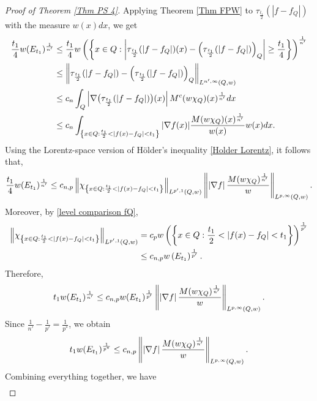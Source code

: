 \documentclass[10pt,a4paper]{amsart}
\newcommand{\strt}[1]{\rule{0pt}{#1}}
\begin{document}
\begin{proof}[Proof of Theorem \ref{Thm PS 4}]
Applying Theorem \ref{Thm FPW} to $\tau_{\frac{t_1}{2}}(|f-f_Q|)$ with the measure $w(x)dx$, we get
\begin{align*}
    \frac{t_1}{4}w(E_{t_1})^\frac{1}{n'}
    &\le \frac{t_1}{4} w\left( \left\{ x\in Q: \left| \tau_{\frac{t_1}{2}}(|f-f_Q|)(x) - \left(\tau_{\frac{t_1}{2}}(|f-f_Q|)\right)_Q \right| \ge \frac{t_1}{4} \right\} \right)^\frac{1}{n'} \\
    &\le \left\| \tau_{\frac{t_1}{2}}(|f-f_Q|) - \left(\tau_{\frac{t_1}{2}}(|f-f_Q|)\right)_Q \right\|_{\strt{2.3ex} L^{n',\infty}(Q, w)} \\
    &\le c_n \int_Q \left|\nabla \big( \tau_{\frac{t_1}{2}}(|f-f_Q|)\big)(x)\right| M^c(w\chi_Q)(x)^\frac{1}{n'}dx \\
    &\le c_n \int_{\left\{x\in Q:\frac{t_1}{2}<|f(x)-f_Q|<t_1\right\}} |\nabla f(x)| \frac{M(w\chi_Q)(x)^\frac{1}{n'}}{w(x)} w(x)dx.
\end{align*}
Using the Lorentz-space version of Hölder's inequality \eqref{Holder Lorentz}, it follows that, 
\begin{equation*}
    \frac{t_1}{4}w(E_{t_1})^\frac{1}{n'} \le c_{n,p} \left\| \chi_{\left\{x\in Q:\frac{t_1}{2}<|f(x)-f_Q|<t_1\right\}} \right\|_{\strt{2.3ex}L^{p',1}(Q,w)} \left\| \left| \nabla f \right| \frac{M(w\chi_Q)^\frac{1}{n'}}{w} \right\|_{\strt{2.3ex}L^{p,\infty}(Q,w)}.
\end{equation*}
Moreover, by \eqref{level comparison fQ}, 
\begin{align*}
    \left\| \chi_{\left\{x\in Q:\frac{t_1}{2}<|f(x)-f_Q|<t_1\right\}} \right\|_{\strt{2.3ex} L^{p',1}(Q,w)}
    &= c_p w\left(\left\{x\in Q:\frac{t_1}{2}<|f(x)-f_Q|<t_1\right\}\right)^\frac{1}{p'} \\
    &\le c_{n,p} w\left(E_{t_1}\right)^\frac{1}{p'}.
\end{align*}
Therefore,
\begin{equation*}
    t_1 w(E_{t_1})^\frac{1}{n'} \le c_{n,p} w(E_{t_1})^\frac{1}{p'} \left\| \left| \nabla f \right| \frac{M(w\chi_Q)^\frac{1}{n'}}{w} \right\|_{\strt{2.3ex} L^{p,\infty}(Q,w)}.
\end{equation*}
Since $\frac{1}{n'}-\frac{1}{p'}=\frac{1}{p^*}$, we obtain
\begin{equation}\label{key level estimate fQ}
    t_1 w(E_{t_1})^\frac{1}{p^*} \le c_{n,p} \left\| \left| \nabla f \right| \frac{M(w\chi_Q)^\frac{1}{n'}}{w} \right\|_{\strt{2.3ex} L^{p,\infty}(Q,w)}.
\end{equation}
Combining everything together, we have
\begin{align*}

\end{align*}
\end{proof}
\end{document}
